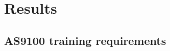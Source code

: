 
\section{Results}
\label{sec:results}

\subsection{AS9100 training requirements}
\label{subsec:as9100}

